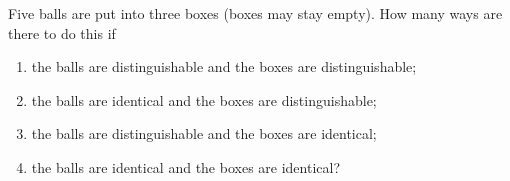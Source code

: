 Five balls are put into three boxes (boxes may stay empty). How many ways are there to do this if
\begin{enumerate}
\item[(a)] the balls are distinguishable and the boxes are distinguishable;
\item[(b)] the balls are identical and the boxes are distinguishable;
\item[(c)] the balls are distinguishable and the boxes are identical;
\item[(d)] the balls are identical and the boxes are identical?
\end{enumerate}
